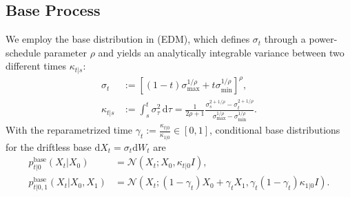 \documentclass[]{fairmeta}
\theoremstyle{remark}
\begin{document}
\subsection{Base Process}
\label{sec:base_process}


We employ the base distribution in \citet{karras2022elucidating} (EDM), which defines $\sigma_t$ through a power-schedule parameter $\rho$ and yields an analytically integrable variance between two different times $\kappa_{t|s}$:
\begin{align}
\sigma_t &:= \left[ (1-t) \sigma_\text{max}^{1/\rho} + t \sigma_\text{min}^{1/\rho} \right]^{\rho}, \label{eq:edm_sde} \\
\kappa_{t|s} &:= \int_s^t \sigma_\tau^2 \, \mathrm{d}\tau = \frac{1}{2\rho + 1} \frac{\sigma_s^{2+1/\rho} - \sigma_t^{2+1/\rho}}{\sigma_\text{max}^{1/\rho} - \sigma_\text{min}^{1/\rho}}.
\end{align}
With the reparametrized time $\gamma_t := \frac{\kappa_{t|0}}{\kappa_{1|0}} \in [0, 1]$, conditional base distributions for the driftless base $\mathrm{d}X_t = \sigma_t \mathrm{d}W_t$ are
\begin{align}
p_{t|0}^\text{base}(X_t | X_0) &= \mathcal{N}(X_t; X_0, \kappa_{t|0}I), \label{eq:time_marginal_0} \\
p_{t|0,1}^\text{base}(X_t | X_0, X_1) &= \mathcal{N}(X_t; (1-\gamma_t)X_0 + \gamma_t X_1, \gamma_t(1-\gamma_t)\kappa_{1|0}I). \label{eq:time_marginal_01}
\end{align}
\end{document}
